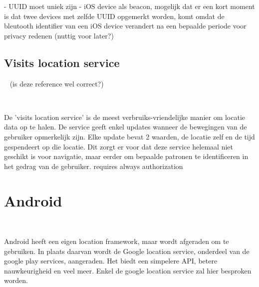 - UUID moet uniek zijn
- iOS device als beacon, mogelijk dat er een kort moment is dat twee devices met zelfde UUID opgemerkt worden, komt omdat de bleutooth identifier van een iOS device verandert na een bepaalde periode voor privacy redenen (nuttig voor later?) 



\subsection{Visits location service}
\label{subsec: visitslocService}
~\textcite{IosVisitsService} (is deze reference wel correct?)

~\autocite{IosVisitsService}

De 'visits location service' is de meest verbruiks-vriendelijke manier om locatie data op te halen. De service geeft enkel updates wanneer de bewegingen van de gebruiker opmerkelijk zijn. Elke update bevat 2 waarden, de locatie zelf en de tijd gespendeert op die locatie. Dit zorgt er voor dat deze service helemaal niet geschikt is voor navigatie, maar eerder om bepaalde patronen te identificeren in het gedrag van de gebruiker. requires always authorization




\section{Android}
\label{sec: android}
~\autocite{AndroidLocationDev}
~\autocite{GoogleLocDev}

Android heeft een eigen location framework, maar wordt afgeraden om te gebruiken. In plaats daarvan wordt de Google location service, onderdeel van de google play services, aangeraden. Het biedt een simpelere API, betere nauwkeurigheid en veel meer. Enkel de google location service zal hier besproken worden.










